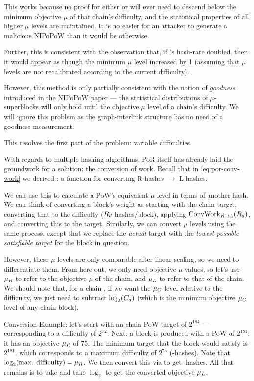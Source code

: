 This works because no proof for either \tradA or \tradB will ever need to descend below the minimum objective $\mu$ of that chain's difficulty, and the statistical properties of all higher $\mu$ levels are maintained.
It is no easier for an attacker to generate a malicious NIPoPoW than it would be otherwise.

Further, this is consistent with the observation that, if \tradA's hash-rate doubled, then it would appear as though the minimum $\mu$ level increased by 1 (assuming that $\mu$ levels are not recalibrated according to the current difficulty).

However, this method is only partially consistent with the notion of \emph{goodness} introduced in the NIPoPoW paper --- the statistical distributions of $\mu$-superblocks will only hold until the objective $\mu$ level of a chain's difficulty.
We will ignore this problem as the graph-interlink structure has no need of a goodness measurement.

This resolves the first part of the problem: variable difficulties.

With regards to multiple hashing algorithms, PoR itself has already laid the groundwork for a solution: the conversion of work.
Recall that in \autoref{eq:por-conv-work} we derived \ConvWork: a function for converting R-hashes $\to$ L-hashes.

We can use this to calculate a PoW's equivalent $\mu$ level in terms of another hash.
We can think of converting a block's weight as starting with the chain \cR target, converting that to the difficulty ($R_d$ hashes/block), applying $\ConvWork{\cR_d}$, and converting this to the \cL target.
Similarly, we can convert $\mu$ levels using the same process, except that we replace the \emph{actual} target with the \emph{lowest possible satisfiable target} for the block in question.

However, these $\mu$ levels are only comparable after linear scaling, so we need to differentiate them.
From here out, we only need objective $\mu$ values, so let's use $\mu_{R}$ to refer to the objective $\mu$ of the \cR chain, and $\mu_{L}$ to refer to that of the \cL chain.
We should note that, for a chain \cC, if we want the $\mu_{C}$ level relative to the difficulty, we just need to subtract $\log_2(C_d)$ (which is the minimum objective $\mu_{C}$ level of any chain \cC block).

Conversion Example: let's start with an \cR chain PoW target of $2^{184}$ --- corresponding to a difficulty of $2^{72}$.
Next, a block is produced with a PoW of $2^{181}$; it has an objective $\mu_{R}$ of 75.
The minimum target that the block would satisfy is $2^{181}$, which corresponds to a maximum difficulty of $2^{75}$ (\cR-hashes).
Note that $\log_2(\text{max. difficulty}) = \mu_{R}$.
We then convert this via  to get \cL-hashes.
All that remains is to take and take $\log_2$ to get the converted objective $\mu_{L}$.


